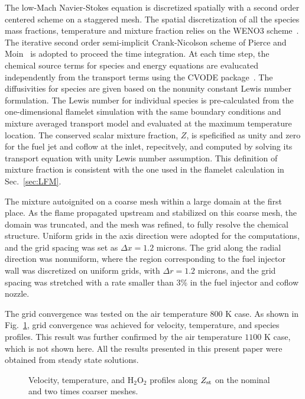 \documentclass[review,3p,times]{elsarticleUS}
\begin{document}
The low-Mach Navier-Stokes equation is discretized spatially with a second order centered scheme on a staggered mesh.  The spatial discretization of all the species mass fractions, temperature and mixture fraction relies on the WENO3 scheme~\cite{liu94}.  The iterative second order semi-implicit Crank-Nicolson scheme of Pierce and Moin~\cite{pierce01} is adopted to proceed the time integration.  At each time step, the chemical source terms for species and energy equations are evalucated independently from the transport terms using the CVODE package~\cite{cvode}.  The diffusivities for species are given based on the nonunity constant Lewis number formulation.  The Lewis number for individual species is pre-calculated from the one-dimensional flamelet simulation with the same boundary conditions and mixture averaged transport model and evaluated at the maximum temperature location.  The conserved scalar mixture fraction, $Z$, is speficified as unity and zero for the fuel jet and coflow at the inlet, repecitvely, and computed by solving its transport equation with unity Lewis number assumption.  This definition of mixture fraction is consistent with the one used in the flamelet calculation in Sec.~\ref{sec:LFM}.

The mixture autoignited on a coarse mesh within a large domain at the first place.  As the flame propagated upstream and stabilized on this coarse mesh, the domain was truncated, and the mesh was refined, to fully resolve the chemical structure.  Uniform grids in the axis direction were adopted for the computations, and the grid spacing was set as $\Delta x = 1.2$ microns.  The grid along the radial direction was nonuniform, where the region corresponding to the fuel injector wall was discretized on uniform grids, with $\Delta r = 1.2$ microns, and the grid spacing was stretched with a rate smaller than $3$\% in the fuel injector and coflow nozzle.

The grid convergence was tested on the air temperature $800$ K case.  As shown in Fig.~\ref{fig:convergence}, grid convergence was achieved for velocity, temperature, and species profiles.  This result was further confirmed by the air temperature $1100$ K case, which is not shown here.  All the results presented in this present paper were obtained from steady state solutions.

\begin{figure}
  \centering
  \scriptsize
  \hspace{-0.40625in}
  
  \hspace{-0.40625in}
  
  \hspace{-0.40625in}
  
  \normalsize
  \caption{Velocity, temperature, and H$_2$O$_2$ profiles along $Z_{\rm st}$ on the nominal and two times coarser meshes.}
  \label{fig:convergence}
\end{figure}
\end{document}
